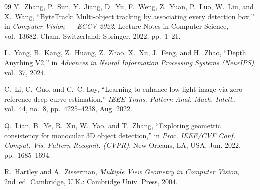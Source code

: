 \documentclass[11pt,a4paper]{report}
\begin{document}
\begin{thebibliography}{99}
Y.~Zhang, P.~Sun, Y.~Jiang, D.~Yu, F.~Weng, Z.~Yuan, P.~Luo, W.~Liu, and
X.~Wang, ``ByteTrack: Multi-object tracking by associating every detection
box,'' in \textit{Computer Vision --- ECCV 2022}, Lecture Notes in Computer
Science, vol.~13682. Cham, Switzerland: Springer, 2022, pp.~1--21.

L.~Yang, B.~Kang, Z.~Huang, Z.~Zhao, X.~Xu, J.~Feng, and H.~Zhao, ``Depth
Anything V2,'' in \textit{Advances in Neural Information Processing Systems
(NeurIPS)}, vol.~37, 2024.

C.~Li, C.~Guo, and C.~C. Loy, ``Learning to enhance low-light image via
zero-reference deep curve estimation,'' \textit{IEEE Trans. Pattern Anal. Mach.
Intell.}, vol.~44, no.~8, pp.~4225--4238, Aug. 2022.

Q.~Lian, B.~Ye, R.~Xu, W.~Yao, and T.~Zhang, ``Exploring geometric consistency
for monocular 3D object detection,'' in \textit{Proc. IEEE/CVF Conf. Comput.
Vis. Pattern Recognit. (CVPR)}, New Orleans, LA, USA, Jun. 2022,
pp.~1685--1694.

R.~Hartley and A.~Zisserman, \textit{Multiple View Geometry in Computer Vision},
2nd~ed. Cambridge, U.K.: Cambridge Univ. Press, 2004.

\end{thebibliography}
\end{document}
